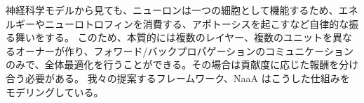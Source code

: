 神経科学モデルから見ても、ニューロンは一つの細胞として機能するため、エネルギーやニューロトロフィンを消費する、アポトーシスを起こすなど自律的な振る舞いをする。
このため、本質的には複数のレイヤー、複数のユニットを異なるオーナーが作り、フォワード/バックプロパゲーションのコミュニケーションのみで、全体最適化を行うことができる。その場合は貢献度に応じた報酬を分け合う必要がある。
我々の提案するフレームワーク、NaaA はこうした仕組みをモデリングしている。





